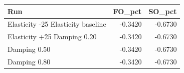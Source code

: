 \begin{tabular}{lrr}
\toprule
Run & FO_pct & SO_pct \\
\midrule
Elasticity -25%
Elasticity baseline & -0.3420 & -0.6730 \\
Elasticity +25%
Damping 0.20 & -0.3420 & -0.6730 \\
Damping 0.50 & -0.3420 & -0.6730 \\
Damping 0.80 & -0.3420 & -0.6730 \\
\bottomrule
\end{tabular}
